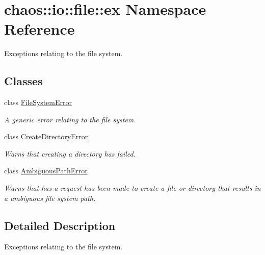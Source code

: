 \hypertarget{namespacechaos_1_1io_1_1file_1_1ex}{\section{chaos\-:\-:io\-:\-:file\-:\-:ex Namespace Reference}
\label{namespacechaos_1_1io_1_1file_1_1ex}
}


Exceptions relating to the file system.  


\subsection*{Classes}
\begin{DoxyCompactItemize}
\item 
class \hyperlink{classchaos_1_1io_1_1file_1_1ex_1_1_file_system_error}{File\-System\-Error}
\begin{DoxyCompactList}\small\item\em A generic error relating to the file system. \end{DoxyCompactList}\item 
class \hyperlink{classchaos_1_1io_1_1file_1_1ex_1_1_create_directory_error}{Create\-Directory\-Error}
\begin{DoxyCompactList}\small\item\em Warns that creating a directory has failed. \end{DoxyCompactList}\item 
class \hyperlink{classchaos_1_1io_1_1file_1_1ex_1_1_ambiguous_path_error}{Ambiguous\-Path\-Error}
\begin{DoxyCompactList}\small\item\em Warns that has a request has been made to create a file or directory that results in a ambiguous file system path. \end{DoxyCompactList}\end{DoxyCompactItemize}


\subsection{Detailed Description}
Exceptions relating to the file system. 